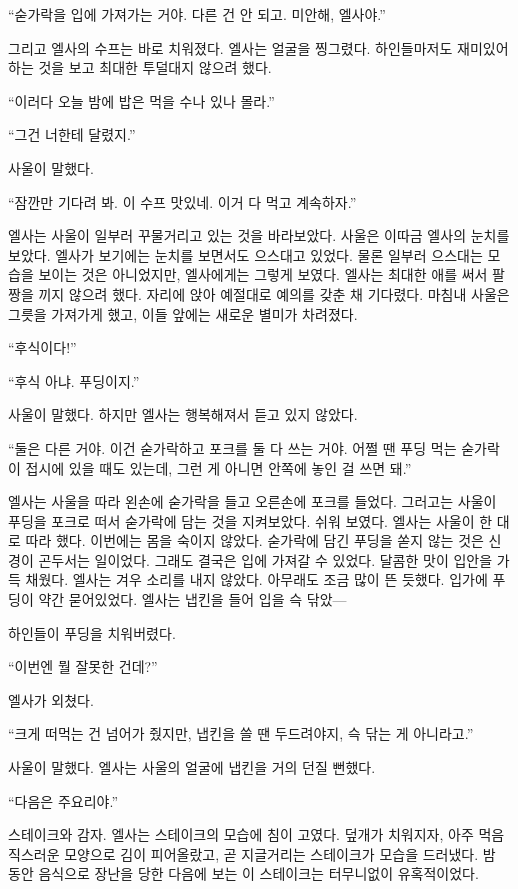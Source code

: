 ``숟가락을 입에 가져가는 거야. 다른 건 안 되고. 미안해, 엘사야.''

그리고 엘사의 수프는 바로 치워졌다. 엘사는 얼굴을 찡그렸다. 하인들마저도 재미있어하는 것을 보고 최대한 투덜대지 않으려 했다.

``이러다 오늘 밤에 밥은 먹을 수나 있나 몰라.''

``그건 너한테 달렸지.''

사울이 말했다.

``잠깐만 기다려 봐. 이 수프 맛있네. 이거 다 먹고 계속하자.''

엘사는 사울이 일부러 꾸물거리고 있는 것을 바라보았다. 사울은 이따금 엘사의 눈치를 보았다. 엘사가 보기에는 눈치를 보면서도 으스대고 있었다. 물론 일부러 으스대는 모습을 보이는 것은 아니었지만, 엘사에게는 그렇게 보였다. 엘사는 최대한 애를 써서 팔짱을 끼지 않으려 했다. 자리에 앉아 예절대로 예의를 갖춘 채 기다렸다. 마침내 사울은 그릇을 가져가게 했고, 이들 앞에는 새로운 별미가 차려졌다.

``후식이다!''

``후식 아냐. 푸딩이지.''

사울이 말했다. 하지만 엘사는 행복해져서 듣고 있지 않았다.

``둘은 다른 거야. 이건 숟가락하고 포크를 둘 다 쓰는 거야. 어쩔 땐 푸딩 먹는 숟가락이 접시에 있을 때도 있는데, 그런 게 아니면 안쪽에 놓인 걸 쓰면 돼.''

엘사는 사울을 따라 왼손에 숟가락을 들고 오른손에 포크를 들었다. 그러고는 사울이 푸딩을 포크로 떠서 숟가락에 담는 것을 지켜보았다. 쉬워 보였다. 엘사는 사울이 한 대로 따라 했다. 이번에는 몸을 숙이지 않았다. 숟가락에 담긴 푸딩을 쏟지 않는 것은 신경이 곤두서는 일이었다. 그래도 결국은 입에 가져갈 수 있었다. 달콤한 맛이 입안을 가득 채웠다. 엘사는 겨우 소리를 내지 않았다. 아무래도 조금 많이 뜬 듯했다. 입가에 푸딩이 약간 묻어있었다. 엘사는 냅킨을 들어 입을 슥 닦았—

하인들이 푸딩을 치워버렸다.

``이번엔 뭘 잘못한 건데?''

엘사가 외쳤다.

``크게 떠먹는 건 넘어가 줬지만, 냅킨을 쓸 땐 두드려야지, 슥 닦는 게 아니라고.''

사울이 말했다. 엘사는 사울의 얼굴에 냅킨을 거의 던질 뻔했다.

``다음은 주요리야.''

스테이크와 감자. 엘사는 스테이크의 모습에 침이 고였다. 덮개가 치워지자, 아주 먹음직스러운 모양으로 김이 피어올랐고, 곧 지글거리는 스테이크가 모습을 드러냈다. 밤 동안 음식으로 장난을 당한 다음에 보는 이 스테이크는 터무니없이 유혹적이었다.

